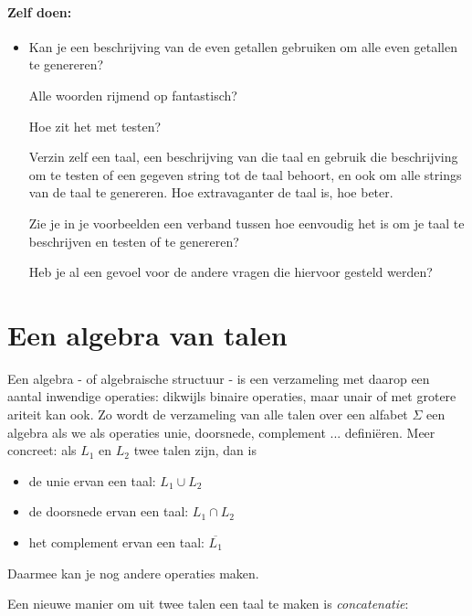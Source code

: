 \paragraph{Zelf doen:}
\begin{itemize}
\item[]

Kan je een beschrijving van de even getallen gebruiken om alle even
getallen te genereren?

Alle woorden rijmend op fantastisch?

Hoe zit het met testen?

Verzin zelf een taal, een beschrijving van die taal en gebruik die
beschrijving om te testen of een gegeven string tot de taal behoort,
en ook om alle strings van de taal te genereren. Hoe extravaganter de
taal is, hoe beter.

Zie je in je voorbeelden een verband tussen hoe eenvoudig het is om je
taal te beschrijven en testen of te genereren?

Heb je al een gevoel voor de andere vragen die hiervoor gesteld werden?
\end{itemize}

\newpage
\section{Een algebra van talen}

Een algebra - of algebraische structuur - is een verzameling met
daarop een aantal inwendige operaties: dikwijls binaire operaties,
maar unair of met grotere ariteit kan ook. Zo wordt de verzameling van
alle talen over een alfabet $\Sigma$ een algebra als we als operaties
unie, doorsnede, complement ... defini\"eren. Meer concreet:
%
als $L_1$ en $L_2$ twee talen zijn, dan is

\begin{itemize}
\item de unie ervan een taal: $L_1 \cup L_2$
\item de doorsnede ervan een taal: $L_1 \cap L_2$
\item het complement ervan een taal: $\overline{L_1}$
\end{itemize}

Daarmee kan je nog andere operaties maken.

Een nieuwe manier om uit twee talen een taal te maken is {\em
concatenatie}:


